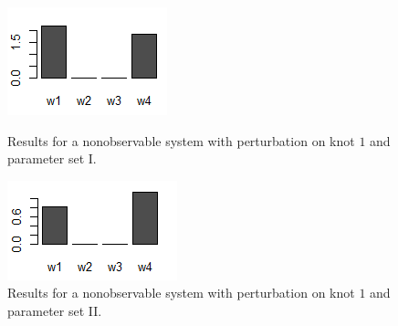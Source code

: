 \begin{figure}[h]
\centering

	\begin{minipage}{0.45\textwidth}		 
		\centering
		\includegraphics[width=\textwidth]{bilder/D14_I.png}
   		\caption{Results for a nonobservable system with perturbation on knot $1$ 
   		 	and parameter set I.} 
   		 \label{fig:notHIO_I}
	\end{minipage}
	\hfill
	\begin{minipage}{0.45\textwidth}
		\vspace{0.0pt} 
		\centering
   		\includegraphics[width=\textwidth]{bilder/D14_II.png}
		\caption{Results for a nonobservable system with perturbation on knot $1$ and 
			parameter set II.} 
		\label{fig:notHIO_II}
	\end{minipage}

\end{figure}
	
